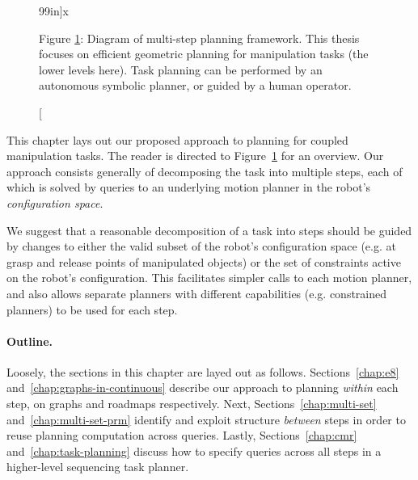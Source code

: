 \begin{figure}
\begin{center}

   \caption[][99in]{x}
   \label{fig:xx-diagram-multi-step}

   \end{center}
   
   \smallskip\noindent\small Figure \ref{fig:xx-diagram-multi-step}:
      Diagram of multi-step planning framework.
      This thesis focuses on efficient geometric planning
      for manipulation tasks (the lower levels here).
      Task planning can be performed by an autonomous
      symbolic planner,
      or guided by a human operator.
\end{figure}

This chapter lays out our proposed approach
to planning for coupled manipulation tasks.
The reader is directed to
Figure~\ref{fig:xx-diagram-multi-step}
for an overview.
Our approach consists generally of decomposing the task into
multiple steps,
each of which is solved by queries to an underlying motion
planner in the robot's
\emph{configuration space}\cite{lozanoperez1983cspace}.


We suggest that a reasonable decomposition of a task into steps
should be guided by changes to either
the valid subset of the robot's configuration space
(e.g. at grasp and release points of manipulated objects)
or the set of constraints active on the robot's configuration.
This facilitates simpler calls to each motion planner,
and also allows separate planners with different capabilities
(e.g. constrained planners)
to be used for each step.

\paragraph{Outline.}
Loosely, the sections in this chapter are layed out as follows.
Sections~\ref{chap:e8} and~\ref{chap:graphs-in-continuous}
describe our approach to planning \emph{within} each step,
on graphs and roadmaps respectively.
Next,
Sections~\ref{chap:multi-set} and~\ref{chap:multi-set-prm}
identify and exploit structure \emph{between} steps
in order to reuse planning computation across queries.
Lastly,
Sections~\ref{chap:cmr} and~\ref{chap:task-planning}
discuss how to specify queries across all steps
in a higher-level sequencing task planner.


